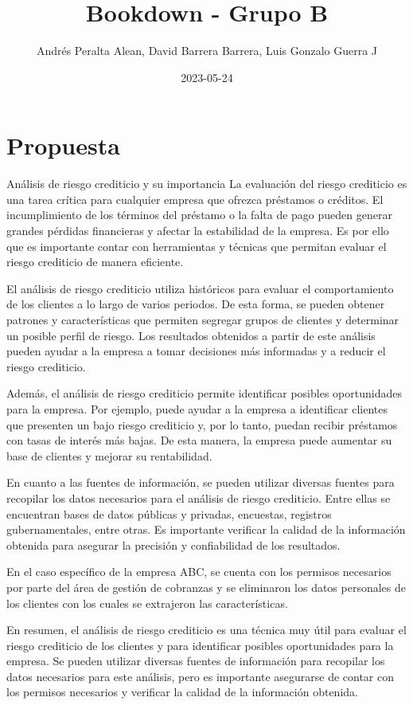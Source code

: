 \documentclass[
]{book}
\title{Bookdown - Grupo B}
\author{Andrés Peralta Alean, David Barrera Barrera, Luis Gonzalo Guerra J}
\date{2023-05-24}
\begin{document}
\maketitle

{
\setcounter{tocdepth}{1}
\tableofcontents
}
\hypertarget{propuesta}{%
\chapter{Propuesta}\label{propuesta}}

Análisis de riesgo crediticio y su importancia La evaluación del riesgo crediticio es una tarea crítica para cualquier empresa que ofrezca préstamos o créditos.
El incumplimiento de los términos del préstamo o la falta de pago pueden generar grandes pérdidas financieras y afectar la estabilidad de la empresa.
Es por ello que es importante contar con herramientas y técnicas que permitan evaluar el riesgo crediticio de manera eficiente.

El análisis de riesgo crediticio utiliza históricos para evaluar el comportamiento de los clientes a lo largo de varios periodos.
De esta forma, se pueden obtener patrones y características que permiten segregar grupos de clientes y determinar un posible perfil de riesgo.
Los resultados obtenidos a partir de este análisis pueden ayudar a la empresa a tomar decisiones más informadas y a reducir el riesgo crediticio.

Además, el análisis de riesgo crediticio permite identificar posibles oportunidades para la empresa.
Por ejemplo, puede ayudar a la empresa a identificar clientes que presenten un bajo riesgo crediticio y, por lo tanto, puedan recibir préstamos con tasas de interés más bajas.
De esta manera, la empresa puede aumentar su base de clientes y mejorar su rentabilidad.

En cuanto a las fuentes de información, se pueden utilizar diversas fuentes para recopilar los datos necesarios para el análisis de riesgo crediticio.
Entre ellas se encuentran bases de datos públicas y privadas, encuestas, registros gubernamentales, entre otras.
Es importante verificar la calidad de la información obtenida para asegurar la precisión y confiabilidad de los resultados.

En el caso específico de la empresa ABC, se cuenta con los permisos necesarios por parte del área de gestión de cobranzas y se eliminaron los datos personales de los clientes con los cuales se extrajeron las características.

En resumen, el análisis de riesgo crediticio es una técnica muy útil para evaluar el riesgo crediticio de los clientes y para identificar posibles oportunidades para la empresa.
Se pueden utilizar diversas fuentes de información para recopilar los datos necesarios para este análisis, pero es importante asegurarse de contar con los permisos necesarios y verificar la calidad de la información obtenida.
\end{document}

